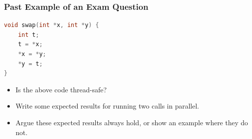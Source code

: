 \begin{frame}[fragile]
  \frametitle{Past Example of an Exam Question}

  

  \begin{lstlisting}[language=C]
void swap(int *x, int *y) {
    int t;
    t = *x;
    *x = *y;
    *y = t;
}  
  \end{lstlisting}
  \vfill
  \begin{itemize}
    \item Is the above code thread-safe?
    \vfill
    \item Write some expected results for running two calls in parallel.
    \vfill
    \item Argue these expected results always hold, or show an example where
      they do not.
  \end{itemize}
  
\end{frame}









